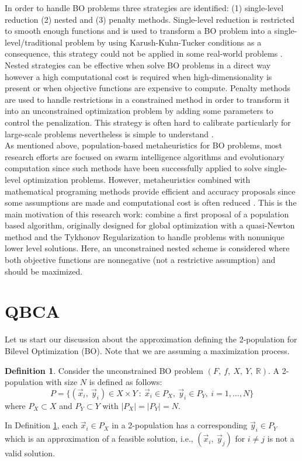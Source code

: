 \documentclass[conference]{IEEEtran}
\theoremstyle{definition}
\newtheorem{definition}{Definition}[section]
\begin{document}
In order to handle BO problems three strategies are identified: (1) single-level
reduction (2) nested and (3) penalty methods. Single-level reduction is restricted
to smooth enough functions and is used to transform a BO problem into a single-level/traditional
problem by using Karush-Kuhn-Tucker conditions as a consequence, this strategy
could not be applied in some real-world problems  \cite{dempe2002foundations,colson2007overview}. %
Nested strategies can be effective when solve BO problems in a direct way  however
a high computational cost is required when high-dimensionality is present or when
objective functions are expensive to compute. Penalty methods are used to handle
restrictions in a constrained method in order to transform it into an unconstrained
optimization problem by adding some parameters to control the penalization. This 
strategy is often hard to calibrate particularly for large-scale problems nevertheless
is simple to understand \cite{savard1994steepest,white1993penalty}.\\

As mentioned above, population-based metaheuristics for BO problems, most research
efforts are focused on swarm intelligence algorithms and evolutionary computation
since such methods have been successfully applied to solve single-level optimization
problems. However, metaheuristics combined with mathematical programing methods provide
efficient and accuracy proposals since some assumptions are made and computational
cost is often reduced \cite{sinha2013efficient,wang2005evolutionary}. This is the
main motivation of this research work: combine a first proposal of a population based
algorithm, originally designed for global optimization \cite{Mejia2018} with a quasi-Newton
method \cite{fletcher2013practical} and the Tykhonov Regularization \cite{dempe2002foundations}
to handle problems with nonunique lower level solutions. Here, an unconstrained
nested scheme is considered where both objective functions are nonnegative (not a
restrictive assumption) and should be maximized.

\section{QBCA} %
\label{sec:qca}

Let us start our discussion about the approximation defining the
2-population for Bilevel Optimization (BO). Note that we are assuming a maximization
process.

\begin{definition}
	\label{def:pop2}
    Consider the unconstrained BO problem $(F, \ f, \ X, \ Y, \ \mathbb{R} )$. A
    2-population with size $N$ is defined as follows:
    $$
        P = \{  (\vec{x}_i, \ \vec{y}_i) \in X \times Y \ : \
                \vec{x}_i \in P_X, \ \vec{y}_i \in P_Y, \ i=1,\ldots,N
            \}
    $$
    where $P_X \subset X$ and $P_Y \subset Y$ with $|P_X| = |P_Y| = N$.
\end{definition}
% 
In Definition \ref{def:pop2}, each $\vec{x}_i \in P_X$ in a 2-population has a
corresponding $\vec{y}_i \in P_Y$ which is an approximation of a feasible solution,
i.e., $(\vec{x}_i, \ \vec{y}_j)$ for $i \neq j$ is  not a valid solution.
% 
\end{document}
